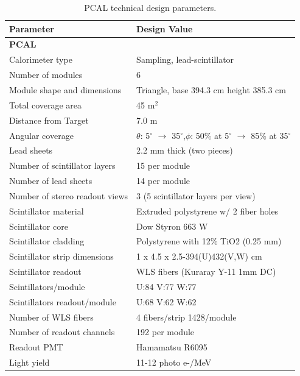 \documentclass[letterpaper,10pt]{article}
\begin{document}
\begin{table}[htbp]
\begin{center}
\begin{tabular}{|l|l|} \hline
{\bf Parameter}        & {\bf Design Value} \\ \hline \hline
{\bf PCAL}         &              \\ \hline 
Calorimeter type   & Sampling, lead-scintillator \\ \hline
Number of modules  & 6  \\ \hline
Module shape and dimensions & Triangle, base 394.3 cm height 385.3 cm \\ \hline
Total coverage area      &  45 m$^2$ \\ \hline
Distance from Target & 7.0 m \\ \hline
Angular coverage   & $\theta$: 5$^\circ$ $\to$ 35$^\circ$,$\phi$: 50\% at 5$^\circ$ $\to$ 85\% at 35$^\circ$ \\ \hline
Lead sheets & 2.2 mm thick (two pieces) \\ \hline
Number of scintillator layers & 15 per module \\ \hline
Number of lead sheets  & 14 per module \\ \hline
Number of stereo readout views & 3 (5 scintillator layers per view) \\ \hline
Scintillator material & Extruded polystyrene w/ 2 fiber holes\\ \hline
Scintillator core & Dow Styron 663 W \\ \hline
Scintillator cladding & Polystyrene with 12$\%$ TiO2 (0.25 mm) \\ \hline
Scintillator strip dimensions & 1 x 4.5 x 2.5-394(U)432(V,W) cm \\ \hline
Scintillator readout & WLS fibers (Kuraray Y-11 1mm DC) \\ \hline
Scintillators/module & U:84 V:77 W:77 \\ \hline
Scintillators readout/module & U:68 V:62 W:62 \\ \hline
Number of WLS fibers & 4 fibers/strip 1428/module \\ \hline
Number of readout channels & 192 per module \\ \hline
Readout PMT & Hamamatsu R6095 \\ \hline
Light yield & 11-12 photo e-/MeV \\ \hline 
\end{tabular}
\end{center}
\caption{PCAL technical design parameters.} 
\end{table}
\end{document}
